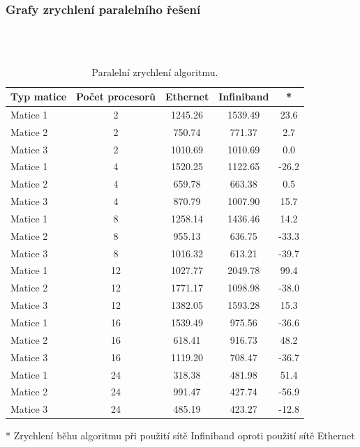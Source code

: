 \documentclass[12pt]{article}
\begin{document}
\subsubsection{Grafy zrychlení paralelního řešení}

\\

\\


\begin{table}[ht]
\centering
\begin{tabular}{|l|c|c|c|c|}
\hline \textbf{Typ matice} & \textbf{Počet procesorů} & \textbf{Ethernet} & \textbf{Infiniband} & * \\
\hline 
\hline Matice 1 & 2 & 1245.26 & 1539.49 & 23.6 \\ 
\hline Matice 2 & 2 & 750.74 & 771.37 & 2.7 \\ 
\hline Matice 3 & 2 & 1010.69 & 1010.69 & 0.0 \\ 
\hline
\hline Matice 1 & 4 & 1520.25 & 1122.65 & -26.2 \\ 
\hline Matice 2 & 4 & 659.78 & 663.38 & 0.5 \\ 
\hline Matice 3 & 4 & 870.79 & 1007.90 & 15.7 \\ 
\hline 
\hline Matice 1 & 8 & 1258.14 & 1436.46 & 14.2 \\ 
\hline Matice 2 & 8 & 955.13 & 636.75 & -33.3 \\ 
\hline Matice 3 & 8 & 1016.32 & 613.21 & -39.7 \\ 
\hline 
\hline Matice 1 & 12 & 1027.77 & 2049.78 & 99.4 \\ 
\hline Matice 2 & 12 & 1771.17 & 1098.98 & -38.0 \\ 
\hline Matice 3 & 12 & 1382.05 & 1593.28 & 15.3 \\ 
\hline 
\hline Matice 1 & 16 & 1539.49 & 975.56 & -36.6 \\ 
\hline Matice 2 & 16 & 618.41 & 916.73 & 48.2 \\ 
\hline Matice 3 & 16 & 1119.20 & 708.47 & -36.7 \\ 
\hline 
\hline Matice 1 & 24 & 318.38 & 481.98 & 51.4 \\ 
\hline Matice 2 & 24 & 991.47 & 427.74 & -56.9 \\ 
\hline Matice 3 & 24 & 485.19 & 423.27 & -12.8 \\ 
\hline 
\end{tabular}
\caption{Paralelní zrychlení algoritmu.}
\label{paralelni_zrychleni}
\end{table}
* Zrychlení běhu algoritmu při použití sítě Infiniband oproti použití sítě Ethernet
\\
\end{document}
